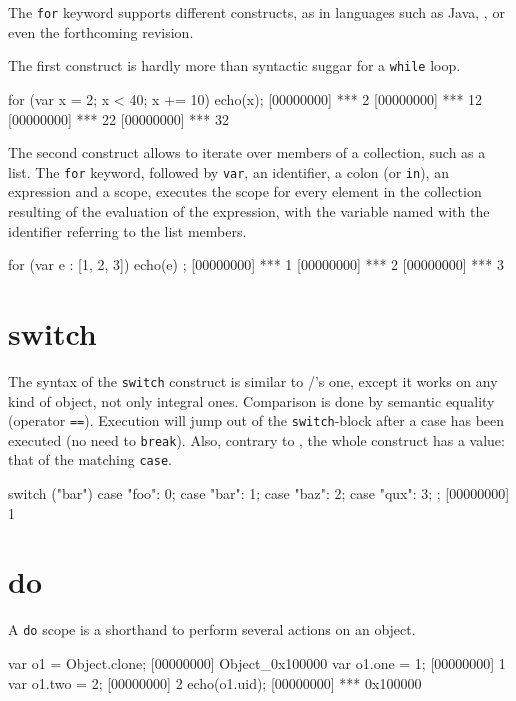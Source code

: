 The \lstinline{for} keyword supports different constructs, as in
languages such as Java, \Cs, or even the forthcoming \Cxx revision.

The first construct is hardly more than syntactic suggar for a
\lstinline{while} loop.

\begin{urbiscript}
for (var x = 2; x < 40; x += 10)
  echo(x);
[00000000] *** 2
[00000000] *** 12
[00000000] *** 22
[00000000] *** 32
\end{urbiscript}

The second construct allows to iterate over members of a collection,
such as a list. The \lstinline{for} keyword, followed by
\lstinline|var|, an identifier, a colon (or \lstinline|in|), an
expression and a scope, executes the scope for every element in the
collection resulting of the evaluation of the expression, with the
variable named with the identifier referring to the list members.

\begin{urbiscript}
for (var e : [1, 2, 3]) { echo(e) };
[00000000] *** 1
[00000000] *** 2
[00000000] *** 3
\end{urbiscript}

\section{switch}

The syntax of the \lstinline|switch| construct is similar to \C/\Cxx's
one, except it works on any kind of object, not only integral
ones. Comparison is done by semantic equality (operator
\lstinline{==}). Execution will jump out of the
\lstinline|switch|-block after a case has been executed (no need to
\lstinline{break}).  Also, contrary to \Cxx, the whole construct has a
value: that of the matching \lstinline{case}.

\begin{urbiscript}
switch ("bar")
{
  case "foo":  0;
  case "bar":  1;
  case "baz":  2;
  case "qux":  3;
};
[00000000] 1
\end{urbiscript}

\section{do}
\label{section:constructs:do}

A \lstinline|do| scope is a shorthand to perform several actions on an
object.

\begin{urbiscript}
var o1 = Object.clone;
[00000000] Object_0x100000
var o1.one = 1;
[00000000] 1
var o1.two = 2;
[00000000] 2
echo(o1.uid);
[00000000] *** 0x100000
\end{urbiscript}

